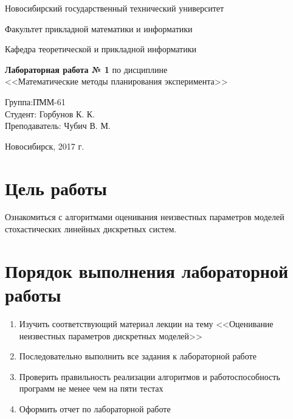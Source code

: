 \documentclass[a4paper,14pt]{extarticle}
\begin{document}
\setcounter{secnumdepth}{0}

\begin{titlepage}

	\begin{center}
		Новосибирский государственный технический университет
		
		Факультет прикладной математики и информатики
		
		Кафедра теоретической и прикладной информатики
		
		\vspace{250pt}
		
		\textbf{\LARGE{Лабораторная работа № 1}}
		\medbreak
		\small{по дисциплине \\
		\medbreak
		<<Математические методы планирования эксперимента>>}
		\vspace{100pt}
	\end{center}

	\begin{flushleft}
		\begin{tabbing}
			Группа:\qquad\qquad \= ПММ-61\\
			Студент:            \> Горбунов К. К.\\
			Преподаватель:      \> Чубич В. М.\\
		\end{tabbing}
	\end{flushleft}

	\begin{center}
		\vspace{\fill}
		Новосибирск, 2017 г.
	\end{center}

\end{titlepage}

\newpage

\section{Цель работы}

Ознакомиться с алгоритмами оценивания неизвестных параметров моделей
стохастических линейных дискретных систем.

\section{Порядок выполнения лабораторной работы}

\begin{enumerate}
\item Изучить соответствующий материал лекции на тему <<Оценивание
	неизвестных параметров дискретных моделей>>

\item Последовательно выполнить все задания к лабораторной работе

\item Проверить правильность реализации алгоритмов и работоспособность
	программ не менее чем на пяти тестах

\item Оформить отчет по лабораторной работе
\end{enumerate}
\end{document}
